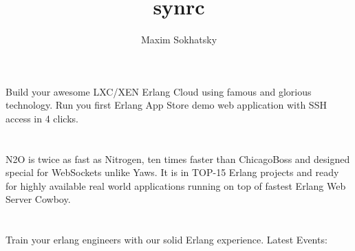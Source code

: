 \documentclass[11pt]{article}
\begin{document}
\title{synrc}
\author{Maxim Sokhatsky}
\section*{}
\paragraph{}
Build your awesome LXC/XEN Erlang Cloud using famous  and glorious  technology.
Run you first Erlang App Store demo web application with SSH access in 4 clicks.

\section*{}
\paragraph{}
N2O is twice as fast as Nitrogen, ten times faster than ChicagoBoss and designed special for WebSockets unlike Yaws.
It is in TOP-15 Erlang projects and ready for highly available real world applications running on top of fastest Erlang Web Server Cowboy.

\section*{}
\paragraph{}
Train your erlang engineers with our solid Erlang experience.
Latest Events:
\paragraph{}
\end{document}
